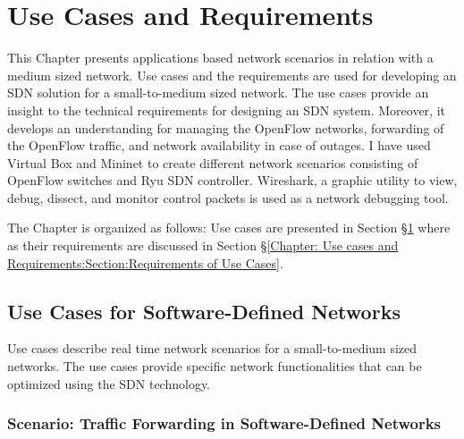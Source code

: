 
\chapter{Use Cases and Requirements }
\label{Chapter: Use Cases and Requirements}
This Chapter presents applications based network scenarios in relation with a medium sized network. Use cases and the requirements are used for developing an SDN solution for a small-to-medium sized network. The use cases provide an insight to the technical requirements for designing an SDN system. Moreover, it develops an understanding for managing the OpenFlow networks, forwarding of the OpenFlow traffic, and network availability in case of outages. I have used Virtual Box and Mininet to create different network scenarios consisting of OpenFlow switches and Ryu SDN controller. Wireshark, a graphic utility to view, debug, dissect, and monitor control packets is used as a network debugging tool.

The Chapter is organized as follows: Use cases are presented in Section \S\ref{Chapter: Use Cases and Requirements} where as their requirements are discussed in Section \S\ref{Chapter: Use cases and Requirements:Section:Requirements of Use Cases}.  
    
\section{Use Cases for Software-Defined Networks}
\label{chapter:Usecases and Requirements:section: Network Usecases}

Use cases describe real time network scenarios for a small-to-medium sized networks. The use cases provide specific network functionalities that can be optimized using the SDN technology.

\subsection{Scenario: Traffic Forwarding in Software-Defined Networks}
\label{chapter:Usecases and Requirements:section: Traffic Forwarding}

